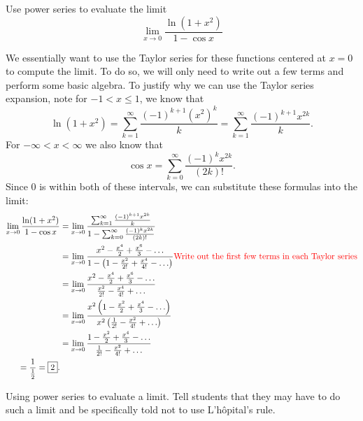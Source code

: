 \documentclass[handout]{ximera}
\begin{document}
\begin{problem}
Use power series to evaluate the limit
	\[
	\lim_{x \to 0} \frac{\ln (1+x^2)}{1 - \cos x}
	\]
	
	\begin{freeResponse}
	We essentially want to use the Taylor series for these functions centered at $x=0$ to compute the limit.  To do so, we will only need to write out a few terms and perform some basic algebra.  To justify why we can use the Taylor series expansion, note for $-1 < x \leq 1$, we know that
		\[
		\ln(1+x^2) = \sum_{k=1}^\infty \frac{(-1)^{k+1} (x^2)^k}{k} = \sum_{k=1}^\infty \frac{(-1)^{k+1} x^{2k}}{k}.
		\]
	For $- \infty < x < \infty$ we also know that
		\[
		\cos x = \sum_{k=0}^\infty \frac{(-1)^k x^{2k}}{(2k)!}.
		\]
	Since $0$ is within both of these intervals, we can substitute these formulas into the limit:
		\begin{align*}
		\lim_{x \to 0} \frac{\ln (1+x^2)}{1 - \cos x}
		&= \lim_{x \to 0} \frac{\sum_{k=1}^\infty \frac{(-1)^{k+1} x^{2k}}{k}}{1 - \sum_{k=0}^\infty \frac{(-1)^k x^{2k}}{(2k)!}}  \\
		&= \lim_{x \to 0} \frac{x^2 - \frac{x^4}{2} + \frac{x^6}{3} - \hdots}{1 - \left( 1 - \frac{x^2}{2!} + \frac{x^4}{4!} - \hdots \right)}  \color{red} \mbox{Write out the first few terms in each Taylor series}\\
		&= \lim_{x \to 0} \frac{x^2 - \frac{x^4}{2} + \frac{x^6}{3} - \hdots}{\frac{x^2}{2!} - \frac{x^4}{4!} + \hdots}  \\
		&= \lim_{x \to 0} \frac{x^2 \left( 1 - \frac{x^2}{2} + \frac{x^4}{3} - \hdots \right) }{x^2 \left( \frac{1}{2!} - \frac{x^2}{4!} + \hdots \right)}  \\
		&= \lim_{x \to 0} \frac{1 - \frac{x^2}{2} + \frac{x^4}{3} - \hdots }{\frac{1}{2!} - \frac{x^2}{4!} + \hdots }  \\
		= \frac{1}{\frac{1}{2}} = \boxed{2}.
		\end{align*} 
		
	\end{freeResponse}
	
\end{problem}

\begin{instructorNotes}
Using power series to evaluate a limit. Tell students that they may have to do such a limit and be specifically told not to use L'h\^{o}pital's rule.
\end{instructorNotes}
\end{document}
